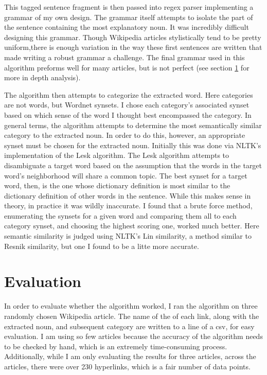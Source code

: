 \documentclass[12pt]{article}
\begin{document}
This tagged sentence fragment is then passed into regex parser implementing a grammar of my own design. The grammar itself attempts to isolate the part of the sentence containing the most explanatory noun. It was incredibly difficult designing this grammar. Though Wikipedia articles stylistically tend to be pretty uniform,there is enough variation in the way these first sentences are written that made writing a robust grammar a challenge. The final grammar used in this algorithm preforms well for many articles, but is not perfect (see section \ref{sec:orgheadline4} for more in depth analysis).

The algorithm then attempts to categorize the extracted word. Here categories are not words, but Wordnet synsets. I chose each category's associated synset based on which sense of the word I thought best encompassed the category. In general terms, the algorithm attempts to determine the most semantically similar category to the extracted noun. In order to do this, however, an appropriate synset must be chosen for the extracted noun. Initially this was done via NLTK's implementation of the Lesk algorithm. The Lesk algorithm attempts to disambiguate a target word based on the assumption that the words in the target word's neighborhood will share a common topic. The best synset for a target word, then, is the one whose dictionary definition is most similar to the dictionary definition of other words in the sentence. While this makes sense in theory, in practice it was wildly inaccurate. I found that a brute force method, enumerating the synsets for a given word and comparing them all to each category synset, and choosing the highest scoring one, worked much better. Here semantic similarity is judged using NLTK's Lin similarity, a method similar to Resnik similarity, but one I found to be a litte more accurate. 

\section{Evaluation}
\label{sec:orgheadline4}

In order to evaluate whether the algorithm worked, I ran the algorithm on three randomly chosen Wikipedia article. The name of the of each link, along with the extracted noun, and subsequent category are written to a line of a csv, for easy evaluation. I am using so few articles because the accuracy of the algorithm needs to be checked by hand, which is an extremely time-consuming process. Additionally, while I am only evaluating the results for three articles, across the articles, there were over 230 hyperlinks, which is a fair number of data points. 
\end{document}

